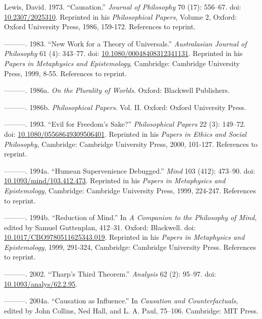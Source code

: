 \documentclass[
  10pt,
  letterpaper,
  DIV=11,
  numbers=noendperiod,
  twoside]{scrartcl}
\newlength{\cslhangindent}
\newenvironment{CSLReferences}[2] %
 {\begin{list}{}{%
  \setlength{\itemindent}{0pt}
  \setlength{\leftmargin}{0pt}
  \setlength{\parsep}{0pt}
  \ifodd #1
   \setlength{\leftmargin}{\cslhangindent}
   \setlength{\itemindent}{-1\cslhangindent}
  \fi
  \setlength{\itemsep}{#2\baselineskip}}}
 {\end{list}}
\begin{document}
\begin{CSLReferences}{1}{0}
Lewis, David. 1973. {``Causation.''} \emph{Journal of Philosophy} 70
(17): 556--67. doi:
\href{https://doi.org/10.2307/2025310}{10.2307/2025310}. Reprinted in
his \emph{Philosophical Papers}, Volume 2, Oxford: Oxford University
Press, 1986, 159-172. References to reprint.

---------. 1983. {``New Work for a Theory of Universals.''}
\emph{Australasian Journal of Philosophy} 61 (4): 343--77. doi:
\href{https://doi.org/10.1080/00048408312341131}{10.1080/00048408312341131}.
Reprinted in his \emph{Papers in Metaphysics and Epistemology},
Cambridge: Cambridge University Press, 1999, 8-55. References to
reprint.

---------. 1986a. \emph{On the Plurality of Worlds}. Oxford: Blackwell
Publishers.

---------. 1986b. \emph{Philosophical Papers}. Vol. II. Oxford: Oxford
University Press.

---------. 1993. {``Evil for Freedom's Sake?''} \emph{Philosophical
Papers} 22 (3): 149--72. doi:
\href{https://doi.org/10.1080/05568649309506401}{10.1080/05568649309506401}.
Reprinted in his \emph{Papers in Ethics and Social Philosophy},
Cambridge: Cambridge University Press, 2000, 101-127. References to
reprint.

---------. 1994a. {``Humean Supervenience Debugged.''} \emph{Mind} 103
(412): 473--90. doi:
\href{https://doi.org/10.1093/mind/103.412.473}{10.1093/mind/103.412.473}.
Reprinted in his \emph{Papers in Metaphysics and Epistemology},
Cambridge: Cambridge University Press, 1999, 224-247. References to
reprint.

---------. 1994b. {``Reduction of Mind.''} In \emph{A Companion to the
Philosophy of Mind}, edited by Samuel Guttenplan, 412--31. Oxford:
Blackwell. doi:
\href{https://doi.org/10.1017/CBO9780511625343.019}{10.1017/CBO9780511625343.019}.
Reprinted in his \emph{Papers in Metaphysics and Epistemology}, 1999,
291-324, Cambridge: Cambridge University Press. References to reprint.

---------. 2002. {``Tharp's Third Theorem.''} \emph{Analysis} 62 (2):
95--97. doi:
\href{https://doi.org/10.1093/analys/62.2.95}{10.1093/analys/62.2.95}.

---------. 2004a. {``Causation as Influence.''} In \emph{Causation and
Counterfactuals}, edited by John Collins, Ned Hall, and L. A. Paul,
75--106. Cambridge: {MIT} Press.


\end{CSLReferences}
\end{document}
